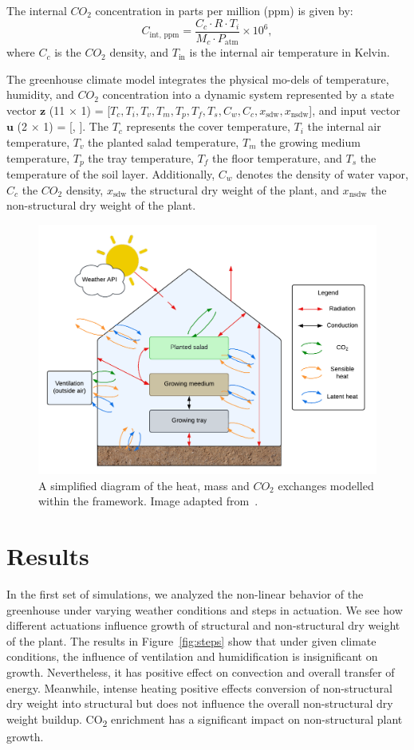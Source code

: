 \documentclass[conference]{IEEEtran}
\begin{document}
The internal \(CO_2\) concentration in parts per million (ppm) is given by:
\begin{equation}
    C_{\text{int, ppm}} = \frac{C_c \cdot R \cdot T_i}{M_c \cdot P_{\text{atm}}} \times 10^6,
\end{equation}
where \(C_c\) is the \(CO_2\) density, and \(T_{\text{in}}\) is the internal air temperature in Kelvin.

The greenhouse climate model integrates the physical mo-dels of temperature, humidity, and \(CO_2\) concentration into a dynamic system represented by a state vector \(\mathbf{z}\) (11 \(\times \) 1) = [\(T_c, T_i, T_v, T_m, T_p, T_f, T_s, C_w, C_c, x_{\text{sdw}}, x_{\text{nsdw}}\)], and input vector \(\mathbf{u}\) (2 \(\times \) 1) = [, ]. The \(T_c\) represents the cover temperature, \(T_i\) the internal air temperature, \(T_v\) the planted salad temperature, \(T_m\) the growing medium temperature, \(T_p\) the tray temperature, \(T_f\) the floor temperature, and \(T_s\) the temperature of the soil layer. Additionally, \(C_w\) denotes the density of water vapor, \(C_c\) the \(CO_2\) density, \(x_{\text{sdw}}\) the structural dry weight of the plant, and \(x_{\text{nsdw}}\) the non-structural dry weight of the plant.

\begin{figure}
    \centering
    \includegraphics[width=.5\textwidth]{images/diagram.pdf}
    \caption{A simplified diagram of the heat, mass and \(CO_2\) exchanges modelled within the framework. Image adapted from~\cite{rmward61_2019}.}\label{fig:diagram}
\end{figure}

\section{Results}
In the first set of simulations, we analyzed the non-linear behavior of the greenhouse under varying weather conditions and steps in actuation. We see how different actuations influence growth of structural and non-structural dry weight of the plant. The results in Figure~\ref{fig:steps} show that under given climate conditions, the influence of ventilation and humidification is insignificant on growth. Nevertheless, it has positive effect on convection and overall transfer of energy. Meanwhile, intense heating positive effects conversion of non-structural dry weight into structural but does not influence the overall non-structural dry weight buildup. CO\textsubscript{2} enrichment has a significant impact on non-structural plant growth.
\end{document}
